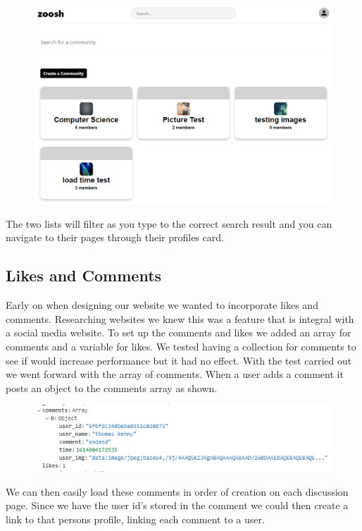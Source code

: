 \begin{figure}[H]
  \centering
  \includegraphics[scale=0.25]{img/communities.PNG}
  \label{fig:Communities within the website.}
\end{figure}

\newline 
The two lists will filter as you type to the correct search result and you can navigate to their pages through their profiles card.


\subsection{Likes and Comments}
Early on when designing our website we wanted to incorporate likes and comments. Researching websites we knew this was a feature that is integral with a social media website. To set up the comments and likes we added an array for comments and a variable for likes. We tested having a collection for comments to see if would increase performance but it had no effect. With the test carried out we went forward with the array of comments. When a user adds a comment it posts an object to the comments array as shown.
\begin{figure}[H]
  \centering
  \includegraphics[scale=1]{img/Commets_likes.PNG}
  \label{fig:Comments And likes}
\end{figure}
We can then easily load these comments in order of creation on each discussion page. Since we have the user id's stored in the comment we could then create a link to that persons profile, linking each comment to a user. 

